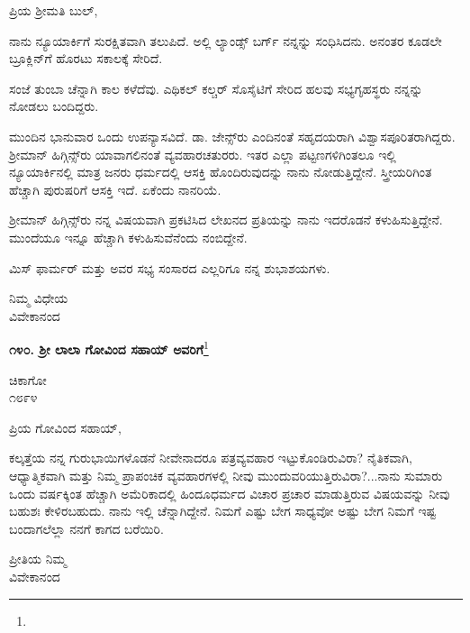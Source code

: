 \noindent
ಪ್ರಿಯ ಶ‍್ರೀಮತಿ ಬುಲ್,

ನಾನು ನ್ಯೂಯಾರ್ಕಿಗೆ ಸುರಕ್ಷಿತವಾಗಿ ತಲುಪಿದೆ. ಅಲ್ಲಿ ಲ್ಯಾಂಡ್ಸ್ ಬರ್ಗ್ ನನ್ನನ್ನು ಸಂಧಿಸಿದನು. ಅನಂತರ ಕೂಡಲೇ ಬ್ರೂಕ್ಲಿನ್‌ಗೆ ಹೊರಟು ಸಕಾಲಕ್ಕೆ ಸೇರಿದೆ.

ಸಂಜೆ ತುಂಬಾ ಚೆನ್ನಾಗಿ ಕಾಲ ಕಳೆದೆವು. ಎಥಿಕಲ್ ಕಲ್ಚರ್ ಸೊಸೈಟಿಗೆ ಸೇರಿದ ಹಲವು ಸಭ್ಯಗೃಹಸ್ಥರು ನನ್ನನ್ನು ನೋಡಲು ಬಂದಿದ್ದರು.

ಮುಂದಿನ ಭಾನುವಾರ ಒಂದು ಉಪನ್ಯಾಸವಿದೆ. ಡಾ. ಜೇನ್ಸ್‌ರು ಎಂದಿನಂತೆ ಸಹೃದಯರಾಗಿ ವಿಶ್ವಾಸಪೂರಿತರಾಗಿದ್ದರು. ಶ‍್ರೀಮಾನ್ ಹಿಗ್ಗಿನ್ಸ್‌ರು ಯಾವಾಗಲಿನಂತೆ ವ್ಯವಹಾರಚತುರರು. ಇತರ ಎಲ್ಲಾ ಪಟ್ಟಣಗಳಿಗಿಂತಲೂ ಇಲ್ಲಿ ನ್ಯೂಯಾರ್ಕಿನಲ್ಲಿ ಮಾತ್ರ ಜನರು ಧರ್ಮದಲ್ಲಿ ಆಸಕ್ತಿ ಹೊಂದಿರುವುದನ್ನು ನಾನು ನೋಡುತ್ತಿದ್ದೇನೆ. ಸ್ತ್ರೀಯರಿಗಿಂತ ಹೆಚ್ಚಾಗಿ ಪುರುಷರಿಗೆ ಆಸಕ್ತಿ ಇದೆ. ಏಕೆಂದು ನಾನರಿಯೆ.

ಶ‍್ರೀಮಾನ್ ಹಿಗ್ಗಿನ್ಸ್‌ರು ನನ್ನ ವಿಷಯವಾಗಿ ಪ್ರಕಟಿಸಿದ ಲೇಖನದ ಪ್ರತಿಯನ್ನು ನಾನು ಇದರೊಡನೆ ಕಳುಹಿಸುತ್ತಿದ್ದೇನೆ. ಮುಂದೆಯೂ ಇನ್ನೂ ಹೆಚ್ಚಾಗಿ ಕಳುಹಿಸುವೆನೆಂದು ನಂಬಿದ್ದೇನೆ.

ಮಿಸ್‌ ಫಾರ್ಮರ್ ಮತ್ತು ಅವರ ಸಭ್ಯ ಸಂಸಾರದ ಎಲ್ಲರಿಗೂ ನನ್ನ ಶುಭಾಶಯಗಳು.

\vspace{-0.45cm}

{\flushright
ನಿಮ್ಮ ವಿಧೇಯ\\ವಿವೇಕಾನಂದ\par}

\begin{center}
\textbf{೧೪೦. ಶ‍್ರೀ ಲಾಲಾ ಗೋವಿಂದ ಸಹಾಯ್ ಅವರಿಗೆ}\footnote{}
\end{center}

\vspace{-0.73cm}

\begin{flushright}
ಚಿಕಾಗೋ\\೧೮೯೪
\end{flushright}

\vspace{-0.5cm}

\noindent
ಪ್ರಿಯ ಗೋವಿಂದ ಸಹಾಯ್,

ಕಲ್ಕತ್ತೆಯ ನನ್ನ ಗುರುಭಾಯಿಗಳೊಡನೆ ನೀವೇನಾದರೂ ಪತ್ರವ್ಯವಹಾರ ಇಟ್ಟುಕೊಂಡಿರುವಿರಾ? ನೈತಿಕವಾಗಿ, ಆಧ್ಯಾತ್ಮಿಕವಾಗಿ ಮತ್ತು ನಿಮ್ಮ ಪ್ರಾಪಂಚಿಕ ವ್ಯವಹಾರಗಳಲ್ಲಿ ನೀವು ಮುಂದುವರಿಯುತ್ತಿರುವಿರಾ?...ನಾನು ಸುಮಾರು ಒಂದು ವರ್ಷಕ್ಕಿಂತ ಹೆಚ್ಚಾಗಿ ಅಮೆರಿಕಾದಲ್ಲಿ ಹಿಂದೂಧರ್ಮದ ವಿಚಾರ ಪ್ರಚಾರ ಮಾಡುತ್ತಿರುವ ವಿಷಯವನ್ನು ನೀವು ಬಹುಶಃ ಕೇಳಿರಬಹುದು. ನಾನು ಇಲ್ಲಿ ಚೆನ್ನಾಗಿದ್ದೇನೆ. ನಿಮಗೆ ಎಷ್ಟು ಬೇಗ ಸಾಧ್ಯವೋ ಅಷ್ಟು ಬೇಗ ನಿಮಗೆ ಇಷ್ಟ ಬಂದಾಗಲೆಲ್ಲಾ ನನಗೆ ಕಾಗದ ಬರೆಯಿರಿ.

\vspace{-0.5cm}

{\flushright
ಪ್ರೀತಿಯ ನಿಮ್ಮ\\ವಿವೇಕಾನಂದ\par}

